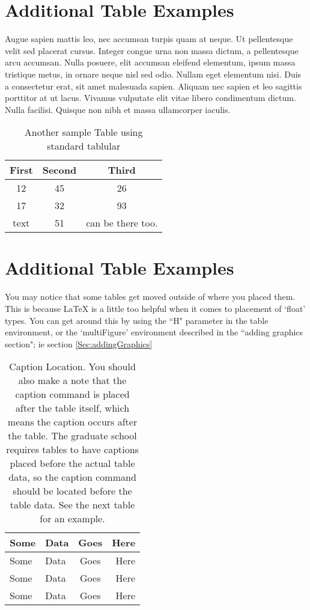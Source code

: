 \section{Additional Table Examples}
Augue sapien mattis leo, nec accumsan turpis quam at neque. Ut pellentesque velit sed placerat cursus. Integer congue urna non massa dictum, a pellentesque arcu accumsan. Nulla posuere, elit accumsan eleifend elementum, ipsum massa tristique metus, in ornare neque nisl sed odio. Nullam eget elementum nisi. Duis a consectetur erat, sit amet malesuada sapien. Aliquam nec sapien et leo sagittis porttitor at ut lacus. Vivamus vulputate elit vitae libero condimentum dictum. Nulla facilisi. Quisque non nibh et massa ullamcorper iaculis.

 \begin{table}[htbp]
    \caption{Another sample Table using standard tablular}\label{sttab}
    \begin{tabular}{c c c}
      \hline
      First & Second & Third \\
      \hline
      12 & 45 & 26 \\
      17 & 32 & 93 \\
      text & 51 & can be there too. \\	
      \hline
    \end{tabular}
\end{table}

\section{Additional Table Examples}
You may notice that some tables get moved outside of where you placed them. This is because \LaTeX{} is a little too helpful when it comes to placement of `float' types. You can get around this by using the ``H" parameter in the table environment, or the `multiFigure' environment described in the ``adding graphics section"; ie section \ref{Sec:addingGraphics}

\begin{table}[H]
\caption[Caption Location]{ Caption Location. You should also make a note that the caption command is placed after the table itself, which means the caption occurs after the table. The graduate school requires tables to have captions placed {before} the actual table data, so the caption command should be located before the table data. See the next table for an example.}
\begin{tabular}{llcr}
\hline
Some    & Data  & Goes  & Here\\
\hline
Some    & Data  & Goes  & Here\\
Some    & Data  & Goes  & Here\\
Some    & Data  & Goes  & Here\\
\hline
\end{tabular}

\end{table}

